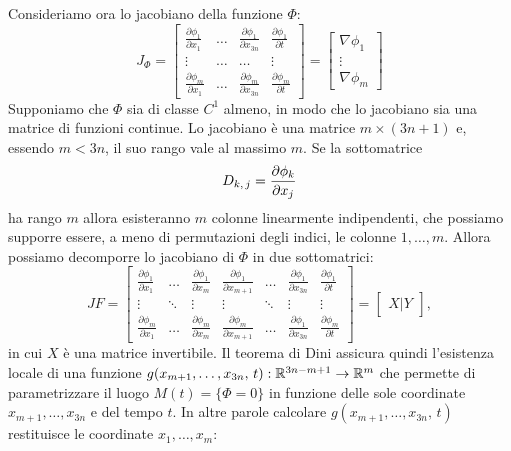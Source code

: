     Consideriamo ora lo jacobiano della funzione $\Phi$:
    \begin{equation}
        J_\Phi = 
        \begin{bmatrix}
            \frac{\partial \phi_1}{\partial x_1}&\dots& \frac{\partial \phi_1}{\partial x_{3n}}&\frac{\partial \phi_1}{\partial t}\\
            \vdots&\dots&\dots&\vdots\\
            \frac{\partial \phi_m}{\partial x_1}&\dots&\frac{\partial \phi_m}{\partial x_{3n}}
            &\frac{\partial \phi_m}{\partial t}
        \end{bmatrix} = \begin{bmatrix}
            \nabla \phi_1\\
            \vdots\\
            \nabla \phi_m
        \end{bmatrix}
    \end{equation}
    Supponiamo che $\Phi$ sia di classe $C^1$ almeno, in modo che lo jacobiano sia una matrice di funzioni continue. Lo jacobiano è una matrice $m \times (3n+1)$ e, essendo $m<3n$, il suo rango vale al massimo $m$. Se la sottomatrice
    \begin{equation}
        D_{k,\,j} = \frac{\partial \phi_k}{\partial x_j}
    \end{equation}
    ha rango $m$ allora esisteranno $m$ colonne linearmente indipendenti, che possiamo supporre essere, a meno di permutazioni degli indici, le colonne $1,\dots,m$. Allora possiamo decomporre lo jacobiano di $\Phi$ in due sottomatrici:  
   \begin{equation}
        JF=\left[\begin{array}{ccc|cccc}
   \frac{\partial \phi_1}{\partial x_1}&\dots& \frac{\partial \phi_1}{\partial x_{m}}&\frac{\partial \phi_1}{\partial x_{m+1}}&\dots&\frac{\partial \phi_1}{\partial x_{3n}}&\frac{\partial \phi_1}{\partial t}\\
            \vdots&\ddots&\vdots&\vdots&\ddots&\vdots&\vdots\\
            \frac{\partial \phi_m}{\partial x_1}&\dots&\frac{\partial \phi_m}{\partial x_{m}}&\frac{\partial \phi_m}{\partial x_{m+1}}&\dots&\frac{\partial \phi_1}{\partial x_{3n}}
            &\frac{\partial \phi_m}{\partial t}
\end{array}\right]=\begin{bmatrix}
    X | Y
\end{bmatrix},
    \end{equation}
    in cui $X$ è una matrice invertibile. Il teorema di Dini assicura quindi l'esistenza locale di una funzione $g(x_{m+1},\dots,x_{3n},\,t): \mathbb{R}^{3n-m+1} \to \mathbb{R}^m$ che permette di parametrizzare il luogo $M(t) = \{\Phi = 0\}$ in funzione delle sole coordinate $x_{m+1},\dots,x_{3n}$ e del tempo $t$. In altre parole calcolare $g(x_{m+1},\dots,x_{3n},\,t)$ restituisce le coordinate $x_1,\dots,x_m$:
